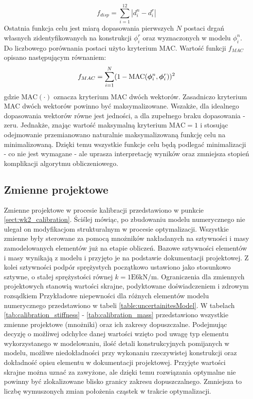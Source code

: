 \begin{equation} \label{eq:wk2_calib_f_disp}
	f_{disp}=\sum_{i=1}^{12} |d_i^n - d_i^r|
\end{equation}
Ostatnia funkcja celu jest miarą dopasowania pierwszych $N$ postaci drgań własnych zidentyfikowanych na konstrukcji $\phi_i^r$ oraz wyznaczonych w modelu $\phi_i^n$. Do liczbowego porównania postaci użyto kryterium MAC. Wartość funkcji $f_{MAC}$ opisano następującym równaniem:
\begin{equation} \label{eq:wk2_calib_f_mass}
	f_{MAC}=\sum_{i=1}^{N} (1-\text{MAC}(\bm{\phi}_i^n, \bm{\phi}_i^r))^2
\end{equation}
gdzie $\text{MAC}(\cdot)$ oznacza kryterium MAC dwóch wektorów. Zasadniczo kryterium MAC dwóch wektorów powinno być maksymalizowane. Wszakże, dla idealnego dopasowania wektorów równe jest jedności, a dla zupełnego braku dopasowania - zeru. Jednakże, znając wartość maksymalną kryterium $\text{MAC}=1$ i stosując odejmowanie przemianowano naturalnie maksymalizowaną funkcję celu na minimalizowaną. Dzięki temu wszystkie funkcje celu będą podlegać minimalizacji - co nie jest wymagane - ale uprasza interpretację wyników oraz zmniejsza stopień komplikacji algorytmu obliczeniowego.

\subsection{Zmienne projektowe}
Zmienne projektowe w procesie kalibracji przedstawiono w punkcie \ref{sect:wk2_calibration}. Ściślej mówiąc, po zbudowaniu modelu numerycznego nie ulegał on modyfikacjom strukturalnym w procesie optymalizacji. Wszystkie zmienne były sterowane za pomocą mnożników nakładanych na sztywności i masy zamodelowanych elementów już na etapie obliczeń. Bazowe sztywności elementów i masy wynikają z modelu i przyjęto je na podstawie dokumentacji projektowej. Z kolei sztywności podpór sprężystych początkowo ustawiono jako stosunkowo sztywne, o stałej sprężystości równej $k=1\text{E}6\text{kN/m}$. Ograniczenia dla zmiennych projektowych stanowią wartości skrajne, podyktowane doświadczeniem i zdrowym rozsądkiem Przykładowe niepewności dla różnych elementów modelu numerycznego przedstawiono w tabeli \ref{table:uncertainitesModel}. W tabelach \ref{tab:calibration_stiffness} - \ref{tab:calibration_mass} przedstawiono wszystkie zmienne projektowe (mnożniki) oraz ich zakresy dopuszczalne. Podejmując decyzję o możliwej odchyłce danej wartości wzięto pod uwagę typ elementu wykorzystanego w modelowaniu, ilość detali konstrukcyjnych pomijanych w modelu, możliwe niedokładności przy wykonaniu rzeczywistej konstrukcji oraz dokładność opisu elementu w dokumentacji projektowej. Przyjęte wartości skrajne można uznać za zawyżone, ale dzięki temu rozwiązania optymalne nie powinny być zlokalizowane blisko granicy zakresu dopuszczalnego. Zmniejsza to liczbę wymuszonych zmian położenia cząstek w trakcie optymalizacji.

